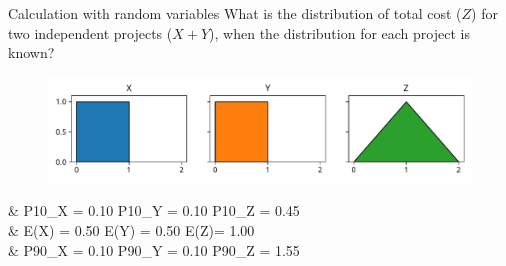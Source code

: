 \documentclass[12pt, aspectratio=149]{beamer}
\theoremstyle{plain}
\begin{document}
\begin{frame}[fragile]{Calculation with random variables}
	What is the distribution of total cost ($Z$) for two independent projects ($X + Y$), when the distribution for each project is known?
    \begin{center}
     \begin{figure}
     	\centering
     	\includegraphics[width=0.99\linewidth]{figures/add_uniform}
     \end{figure}
     \end{center}
	 \begin{flalign*}
     	&\hspace*{1em} P10_X = 0.10 \hspace*{4em} P10_Y = 0.10 \hspace*{4em}  P10_Z = 0.45 \\
	 	&\hspace*{1em} E(X) = 0.50 \hspace*{4em}  E(Y) = 0.50 \hspace*{4em}   E(Z)= 1.00 \\
     	&\hspace*{1em} P90_X = 0.10 \hspace*{4em} P90_Y = 0.10 \hspace*{4em}  P90_Z = 1.55 \\
	\end{flalign*}
\end{frame}
\end{document}
